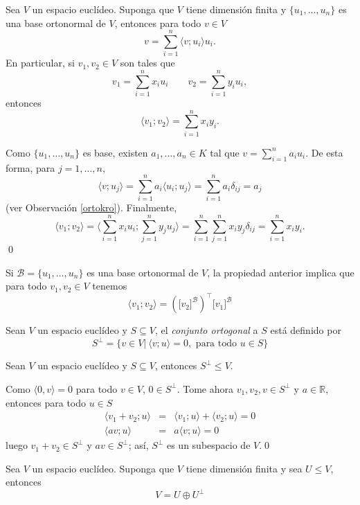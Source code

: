 \begin{pro}\label{coorortonor}
Sea $V$ un espacio eucl\'ideo. Suponga que $V$ tiene dimensi\'on finita y $\{u_1,\ldots,u_n\}$ es una base ortonormal de $V$, entonces para todo $v\in V$
\[
v=\sum_{i=1}^n\langle v;u_i\rangle u_i.
\]
En particular, si $v_1,v_2\in V$ son tales que
\[
v_1=\sum_{i=1}^nx_iu_i\qquad v_2=\sum_{i=1}^ny_iu_i,
\]
entonces
\[
\langle v_1;v_2\rangle=\sum_{i=1}^nx_iy_i.
\]
\end{pro}

\dem Como $\{u_1,\ldots,u_n\}$ es base, existen $a_1,\ldots,a_n\in K$ tal que $v=\sum_{i=1}^na_iu_i$. De esta forma, para $j=1,\ldots,n$, 
\[
\langle v;u_j\rangle=\sum_{i=1}^na_i\langle u_i;u_j\rangle=\sum_{i=1}^n a_i\delta_{ij}=a_j
\]
(ver Observaci\'on \ref{ortokro}). Finalmente,
\[
\langle v_1;v_2\rangle=\langle\sum_{i=1}^nx_iu_i;\sum_{j=1}^ny_ju_j\rangle=\sum_{i=1}^n\sum_{j=1}^nx_iy_j\delta_{ij}=\sum_{i=1}^nx_iy_i.
\]
\qed

\begin{obs}\label{prodort}
Si $\mathcal{B}=\{u_1,\ldots,u_n\}$ es una base ortonormal de $V$, la propiedad anterior implica que para todo $v_1,v_2\in V$ tenemos
$$\langle v_1;v_2\rangle=\left(\big[v_2\big]^{\mathcal{B}}\right)^\intercal\big[v_1\big]^{\mathcal{B}}$$
\end{obs}

\begin{defn}
Sean $V$ un espacio eucl\'ideo y $S\subseteq V$, el \emph{conjunto ortogonal} a $S$ est\'a definido por
\[
S^\perp=\{v\in V|\ \langle v;u\rangle=0, \textrm{ para todo } u\in S\}
\]
\end{defn}

\begin{pro}\label{ortsubesp}
Sean $V$ un espacio eucl\'ideo y $S\subseteq V$, entonces $S^\perp\le V$.
\end{pro}

\dem Como $\langle 0,v\rangle=0$ para todo $v\in V$, $0\in S^\perp$. Tome ahora $v_1,v_2,v\in S^\perp$ y $a\in\mathbb{R}$, entonces para todo $u\in S$
\begin{eqnarray*}
\langle v_1+v_2;u\rangle & = & \langle v_1;u\rangle+\langle v_2;u\rangle=0\\
\langle av;u\rangle & = & a\langle v;u\rangle=0 
\end{eqnarray*}
luego $v_1+v_2\in S^\perp$ y $av\in S^\perp$; as\'i, $S^\perp$ es un subespacio de $V$.\qed

\begin{teo}\label{complort}
Sea $V$ un espacio eucl\'ideo. Suponga que $V$ tiene dimensi\'on finita y sea $U\le V$, entonces
\[
V=U\oplus U^\perp
\]
\end{teo}

